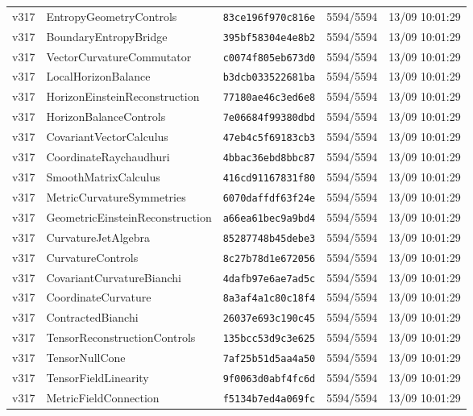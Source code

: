 \documentclass[11pt]{article}
\theoremstyle{definition}\newtheorem{deriv}{Derivation}
\begin{document}
{\begin{longtable}{@{}lllll@{}}
v317 & EntropyGeometryControls & \texttt{83ce196f970c816e} & 5594/5594 & 13/09 10:01:29 \\
v317 & BoundaryEntropyBridge & \texttt{395bf58304e4e8b2} & 5594/5594 & 13/09 10:01:29 \\
v317 & VectorCurvatureCommutator & \texttt{c0074f805eb673d0} & 5594/5594 & 13/09 10:01:29 \\
v317 & LocalHorizonBalance & \texttt{b3dcb033522681ba} & 5594/5594 & 13/09 10:01:29 \\
v317 & HorizonEinsteinReconstruction & \texttt{77180ae46c3ed6e8} & 5594/5594 & 13/09 10:01:29 \\
v317 & HorizonBalanceControls & \texttt{7e06684f99380dbd} & 5594/5594 & 13/09 10:01:29 \\
v317 & CovariantVectorCalculus & \texttt{47eb4c5f69183cb3} & 5594/5594 & 13/09 10:01:29 \\
v317 & CoordinateRaychaudhuri & \texttt{4bbac36ebd8bbc87} & 5594/5594 & 13/09 10:01:29 \\
v317 & SmoothMatrixCalculus & \texttt{416cd91167831f80} & 5594/5594 & 13/09 10:01:29 \\
v317 & MetricCurvatureSymmetries & \texttt{6070daffdf63f24e} & 5594/5594 & 13/09 10:01:29 \\
v317 & GeometricEinsteinReconstruction & \texttt{a66ea61bec9a9bd4} & 5594/5594 & 13/09 10:01:29 \\
v317 & CurvatureJetAlgebra & \texttt{85287748b45debe3} & 5594/5594 & 13/09 10:01:29 \\
v317 & CurvatureControls & \texttt{8c27b78d1e672056} & 5594/5594 & 13/09 10:01:29 \\
v317 & CovariantCurvatureBianchi & \texttt{4dafb97e6ae7ad5c} & 5594/5594 & 13/09 10:01:29 \\
v317 & CoordinateCurvature & \texttt{8a3af4a1c80c18f4} & 5594/5594 & 13/09 10:01:29 \\
v317 & ContractedBianchi & \texttt{26037e693c190c45} & 5594/5594 & 13/09 10:01:29 \\
v317 & TensorReconstructionControls & \texttt{135bcc53d9c3e625} & 5594/5594 & 13/09 10:01:29 \\
v317 & TensorNullCone & \texttt{7af25b51d5aa4a50} & 5594/5594 & 13/09 10:01:29 \\
v317 & TensorFieldLinearity & \texttt{9f0063d0abf4fc6d} & 5594/5594 & 13/09 10:01:29 \\
v317 & MetricFieldConnection & \texttt{f5134b7ed4a069fc} & 5594/5594 & 13/09 10:01:29 \\

\end{longtable}}
\end{document}
